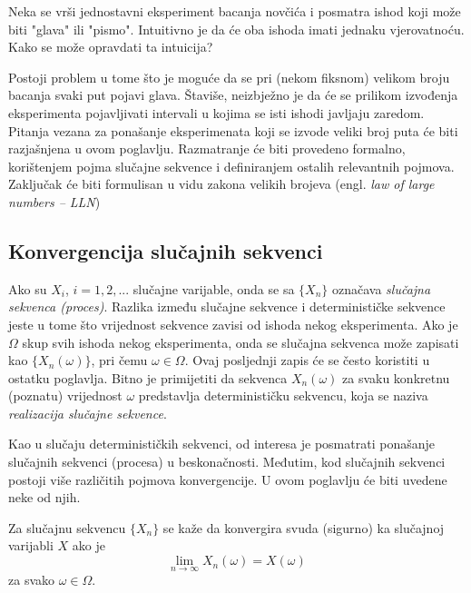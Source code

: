 Neka se vrši jednostavni eksperiment bacanja novčića i posmatra ishod koji može
biti "glava" ili "pismo". Intuitivno je da će oba ishoda imati jednaku
vjerovatnoću. Kako se može opravdati ta intuicija?

Postoji problem u tome što je moguće da se pri (nekom fiksnom) velikom broju
bacanja svaki put pojavi glava. Štaviše, neizbježno je da će se prilikom
izvođenja eksperimenta pojavljivati intervali u kojima se isti ishodi javljaju
zaredom. Pitanja vezana za ponašanje eksperimenata koji se izvode veliki broj
puta će biti razjašnjena u ovom poglavlju. Razmatranje će biti provedeno
formalno, korištenjem pojma slučajne sekvence i definiranjem ostalih relevantnih
pojmova. Zaključak će biti formulisan u vidu zakona velikih brojeva (engl.
\textit{law of large numbers -- LLN})

\subsection{Konvergencija slučajnih sekvenci}

Ako su $X_i$, $i=1,2,...$ slučajne varijable, onda se sa $\{X_n\}$ označava
\textit{slučajna sekvenca (proces)}. Razlika između slučajne sekvence i
determinističke sekvence jeste u tome što vrijednost sekvence zavisi od ishoda
nekog eksperimenta.  Ako je $\Omega$ skup svih ishoda nekog eksperimenta, onda
se slučajna sekvenca može zapisati kao $\{X_n(\omega)\}$, pri čemu $\omega \in
\Omega$. Ovaj posljednji zapis će se često koristiti u ostatku poglavlja. Bitno
je primijetiti da sekvenca $X_n(\omega)$ za svaku konkretnu (poznatu) vrijednost
$\omega$ predstavlja determinističku sekvencu, koja se naziva
\textit{realizacija slučajne sekvence}.

Kao u slučaju determinističkih sekvenci, od interesa je posmatrati ponašanje
slučajnih sekvenci (procesa) u beskonačnosti. Međutim, kod slučajnih sekvenci
postoji više različitih pojmova konvergencije. U ovom poglavlju će biti uvedene
neke od njih. 

\begin{definition}
  Za slučajnu sekvencu $\{X_n\}$ se kaže da konvergira svuda (sigurno) ka
  slučajnoj varijabli $X$ ako je
  \begin{equation}
    \lim_{n\to\infty} X_n(\omega) = X(\omega)
  \end{equation}
  za svako $\omega \in \Omega$.
\end{definition}


